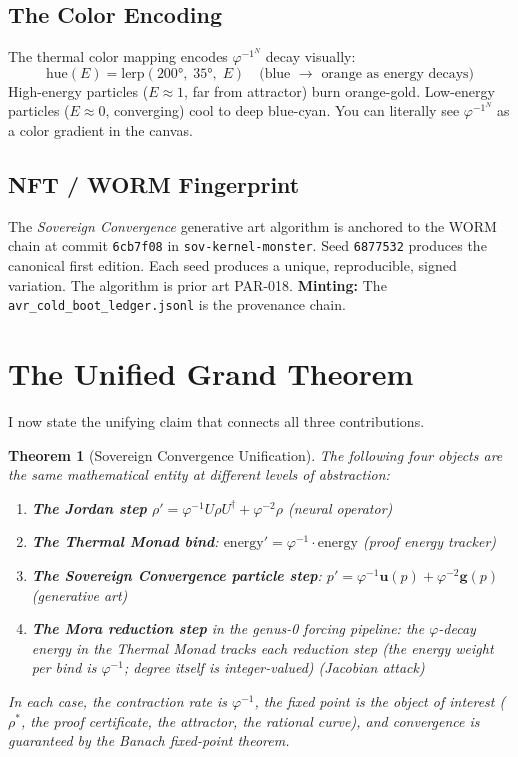 \documentclass[12pt, letterpaper]{article}
\theoremstyle{plain}
\newtheorem{theorem}{Theorem}[section]
\theoremstyle{definition}
\theoremstyle{remark}
\newcommand{\phiinv}{\varphi^{-1}}
\newcommand{\phiinvsq}{\varphi^{-2}}
\begin{document}
\subsection{The Color Encoding}

The thermal color mapping encodes $\phiinv^N$ decay visually:
\[
  \text{hue}(E) = \text{lerp}(200°,\; 35°,\; E)
  \quad \text{(blue } \to \text{ orange as energy decays)}
\]
High-energy particles ($E \approx 1$, far from attractor) burn orange-gold.
Low-energy particles ($E \approx 0$, converging) cool to deep blue-cyan.
You can literally see $\phiinv^N$ as a color gradient in the canvas.

\subsection{NFT / WORM Fingerprint}

\begin{wormbox}
The \textit{Sovereign Convergence} generative art algorithm is anchored to the
WORM chain at commit \texttt{6cb7f08} in \texttt{sov-kernel-monster}.
Seed \texttt{6877532} produces the canonical first edition.
Each seed produces a unique, reproducible, signed variation.
The algorithm is prior art PAR-018.
\textbf{Minting:} The \texttt{avr\_cold\_boot\_ledger.jsonl} is the provenance chain.
\end{wormbox}

\section{The Unified Grand Theorem}

I now state the unifying claim that connects all three contributions.

\begin{theorem}[Sovereign Convergence Unification]
\label{thm:grand}
The following four objects are the same mathematical entity at different levels
of abstraction:
\begin{enumerate}
  \item \textbf{The Jordan step} $\rho' = \phiinv U\rho U^\dagger + \phiinvsq\rho$
        (neural operator)
  \item \textbf{The Thermal Monad bind}: $\text{energy}' = \phiinv \cdot \text{energy}$
        (proof energy tracker)
  \item \textbf{The Sovereign Convergence particle step}:
        $p' = \phiinv \mathbf{u}(p) + \phiinvsq \mathbf{g}(p)$
        (generative art)
  \item \textbf{The Mora reduction step} in the genus-0 forcing pipeline:
        the $\varphi$-decay energy in the Thermal Monad tracks each reduction step
        (the energy weight per bind is $\phiinv$; degree itself is integer-valued)
        (Jacobian attack)
\end{enumerate}
In each case, the contraction rate is $\phiinv$, the fixed point is the object
of interest ($\rho^*$, the proof certificate, the attractor, the rational curve),
and convergence is guaranteed by the Banach fixed-point theorem.
\end{theorem}
\end{document}
